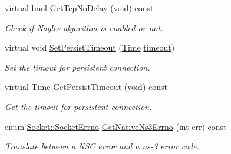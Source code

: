 \begin{DoxyCompactItemize}
virtual bool \hyperlink{classns3_1_1NscTcpSocketImpl_a00e8717a2b55b588b2da426fcdbb06ac}{Get\+Tcp\+No\+Delay} (void) const 
\begin{DoxyCompactList}\small\item\em Check if Nagle\textquotesingle{}s algorithm is enabled or not. \end{DoxyCompactList}\item 
virtual void \hyperlink{classns3_1_1NscTcpSocketImpl_a113ad5ff7973d66ac7d5be555724308e}{Set\+Persist\+Timeout} (\hyperlink{classns3_1_1Time}{Time} \hyperlink{openflow-switch_8cc_a386d174ae121d1cfa279074b7e209714}{timeout})
\begin{DoxyCompactList}\small\item\em Set the timout for persistent connection. \end{DoxyCompactList}\item 
virtual \hyperlink{classns3_1_1Time}{Time} \hyperlink{classns3_1_1NscTcpSocketImpl_aea3ffda82167d2115b41b252f7b0b4f2}{Get\+Persist\+Timeout} (void) const 
\begin{DoxyCompactList}\small\item\em Get the timout for persistent connection. \end{DoxyCompactList}\item 
enum \hyperlink{classns3_1_1Socket_ada1328c5ae0c28cb2a982caf8f6d6cca}{Socket\+::\+Socket\+Errno} \hyperlink{classns3_1_1NscTcpSocketImpl_ab51d8cb7b342dbc2e4c843886944d09f}{Get\+Native\+Ns3\+Errno} (int err) const 
\begin{DoxyCompactList}\small\item\em Translate between a N\+SC error and a ns-\/3 error code. \end{DoxyCompactList}\end{DoxyCompactItemize}
